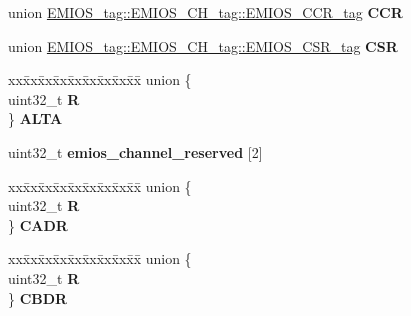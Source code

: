 \begin{DoxyCompactItemize}
\begin{tabbing}
\end{tabbing}\item 
\mbox{\label{structEMIOS__tag_1_1EMIOS__CH__tag_a6e29a5924d4273f4f92a365dc7c34031}} 
union \mbox{\hyperlink{unionEMIOS__tag_1_1EMIOS__CH__tag_1_1EMIOS__CCR__tag}{E\+M\+I\+O\+S\+\_\+tag\+::\+E\+M\+I\+O\+S\+\_\+\+C\+H\+\_\+tag\+::\+E\+M\+I\+O\+S\+\_\+\+C\+C\+R\+\_\+tag}} {\bfseries C\+CR}
\item 
\mbox{\label{structEMIOS__tag_1_1EMIOS__CH__tag_af6bd296886e79cae274641c356f88d8a}} 
union \mbox{\hyperlink{unionEMIOS__tag_1_1EMIOS__CH__tag_1_1EMIOS__CSR__tag}{E\+M\+I\+O\+S\+\_\+tag\+::\+E\+M\+I\+O\+S\+\_\+\+C\+H\+\_\+tag\+::\+E\+M\+I\+O\+S\+\_\+\+C\+S\+R\+\_\+tag}} {\bfseries C\+SR}
\item 
\mbox{\label{structEMIOS__tag_1_1EMIOS__CH__tag_a90cff12ae9a1acdbf0bb645374bbba78}} 
\begin{tabbing}
xx\=xx\=xx\=xx\=xx\=xx\=xx\=xx\=xx\=\kill
union \{\\
\>uint32\_t {\bfseries R}\\
\} {\bfseries ALTA}\\

\end{tabbing}\item 
\mbox{\label{structEMIOS__tag_1_1EMIOS__CH__tag_a8b9087ea3ec99270e3c6bafee3fbf6a6}} 
uint32\+\_\+t {\bfseries emios\+\_\+channel\+\_\+reserved} \mbox{[}2\mbox{]}
\item 
\mbox{\label{structEMIOS__tag_1_1EMIOS__CH__tag_a548cb284c871ec64035beeca939006ca}} 
\begin{tabbing}
xx\=xx\=xx\=xx\=xx\=xx\=xx\=xx\=xx\=\kill
union \{\\
\>uint32\_t {\bfseries R}\\
\} {\bfseries CADR}\\

\end{tabbing}\item 
\mbox{\label{structEMIOS__tag_1_1EMIOS__CH__tag_a021e4a152a643c5260c7713b4947fef3}} 
\begin{tabbing}
xx\=xx\=xx\=xx\=xx\=xx\=xx\=xx\=xx\=\kill
union \{\\
\>uint32\_t {\bfseries R}\\
\} {\bfseries CBDR}\\


\end{tabbing}
\end{DoxyCompactItemize}
